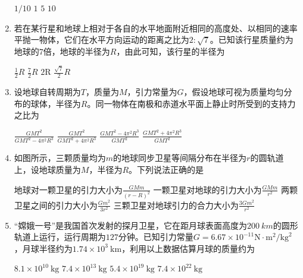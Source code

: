 \begin{enumerate}[leftmargin=0em]
\fourchoices
{$ 1/10 $}
{$ 1 $}
{$ 5 $}
{$ 10 $}




\item 
{}
若在某行星和地球上相对于各自的水平地面附近相同的高度处、以相同的速率平抛一物体，它们在水平方向运动的距离之比为$ 2:\sqrt{7} $。已知该行星质量约为地球的$ 7 $倍，地球的半径为$ R $，由此可知，该行星的半径为  

\fourchoices
{$ \frac { 1 } { 2 } R $}
{$ \frac { 7 } { 2 } R $}
{$ 2 \mathrm { R } $}
{$ \frac { \sqrt { 7 } } { 2 } R $}

\item 
{}
设地球自转周期为$ T $，质量为$ M $，引力常量为$ G $，假设地球可视为质量均匀分布的球体，半径为$ R $。同一物体在南极和赤道水平面上静止时所受到的支持力之比为  

\fourchoices
{$ \frac { G M T ^ { 2 } } { G M T ^ { 2 } - 4 \pi ^ { 2 } R ^ { 3 } } $}
{$ \frac { G M T ^ { 2 } } { G M T ^ { 2 } + 4 \pi ^ { 2 } R ^ { 3 } } $}
{$ \frac { G M T ^ { 2 } - 4 \pi ^ { 2 } R ^ { 3 } } { G M T ^ { 2 } } $}
{$ \frac { G M T ^ { 2 } + 4 \pi ^ { 2 } R ^ { 3 } } { G M T ^ { 2 } } $}




\item 
{}
如图所示，三颗质量均为$ m $的地球同步卫星等间隔分布在半径为$ r $的圆轨道上，设地球质量为$ M $，半径为$ R $。下列说法正确的是  
\begin{figure}[h!]
\centering

\end{figure}

\fourchoices
{地球对一颗卫星的引力大小为$\frac { G M m } { ( r - R ) ^ { 2 } }$}
{一颗卫星对地球的引力大小为$\frac { G M m } { r ^ { 2 } }$}
{两颗卫星之间的引力大小为$\frac { G m ^ { 2 } } { 3 r ^ { 2 } }$}
{三颗卫星对地球引力的合力大小为$\frac {3 G m ^ { 2 } } { r ^ { 2 } }$}


\item
{}
“嫦娥一号”是我国首次发射的探月卫星，它在距月球表面高度为$ 200 \ km $的圆形轨道上运行，运行周期为$ 127 $分钟。已知引力常量$G = 6.67 \times 10 ^ { - 11 } \mathrm { N } \cdot \mathrm { m } ^ { 2 } / \mathrm { kg } ^ { 2 }$，月球半径约为$1.74 \times 10 ^ { 3 }\ \mathrm { km }$，利用以上数据估算月球的质量约为  

\fourchoices
{$ 8.1 \times 10 ^ { 10 }\ \mathrm { kg } $}
{$ 7.4 \times 10 ^ { 13 }\ \mathrm { kg } $}
{$ 5.4 \times 10 ^ { 19 }\ \mathrm { kg } $}
{$ 7.4 \times 10 ^ { 22 }\ \mathrm { kg } $}


\end{enumerate}
